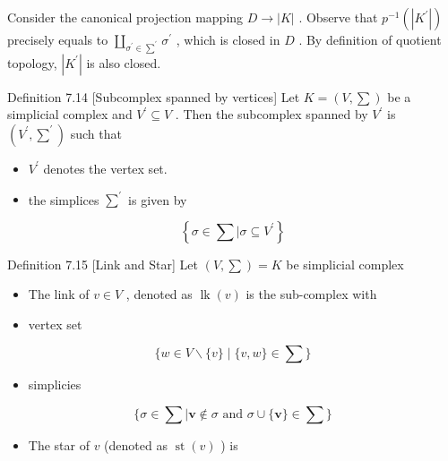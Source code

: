 Consider the canonical projection mapping \(D \rightarrow  \left| K\right|\) . Observe that \({p}^{-1}\left( \left| {K}^{\prime }\right| \right)\) precisely equals to \(\mathop{\coprod }\limits_{{{\sigma }^{\prime } \in  {\sum }^{\prime }}}{\sigma }^{\prime }\) , which is closed in \(D\) . By definition of quotient topology, \(\left| {K}^{\prime }\right|\) is also closed.

Definition 7.14 [Subcomplex spanned by vertices] Let \(K = \left( {V,\sum }\right)\) be a simplicial complex and \({V}^{\prime } \subseteq  V\) . Then the subcomplex spanned by \({V}^{\prime }\) is \(\left( {{V}^{\prime },{\sum }^{\prime }}\right)\) such that

\begin{itemize}
\item \({V}^{\prime }\) denotes the vertex set.
\end{itemize}

\begin{itemize}
\item the simplices \({\sum }^{\prime }\) is given by
\end{itemize}

\[
\left\{  {\sigma  \in  \sum  \mid  \sigma  \subseteq  {V}^{\prime }}\right\}
\]

Definition 7.15 [Link and Star] Let \(\left( {V,\sum }\right)  = K\) be simplicial complex

\begin{itemize}
\item The link of \(v \in  V\) , denoted as \(\operatorname{lk}\left( v\right)\) is the sub-complex with
\end{itemize}

\begin{itemize}
\item vertex set
\end{itemize}

\[
\{ w \in  V \smallsetminus  \{ v\}  \mid  \{ v,w\}  \in  \sum \}
\]

\begin{itemize}
\item simplicies
\end{itemize}

\[
\{ \sigma  \in  \sum  \mid  \mathbf{v} \notin  \sigma \text{ and }\sigma  \cup  \{ \mathbf{v}\}  \in  \sum \}
\]

\begin{itemize}
\item The star of \(v\) (denoted as \(\operatorname{st}\left( v\right)\) ) is
\end{itemize}

